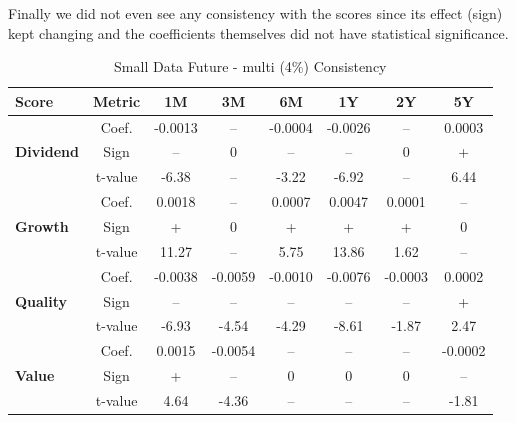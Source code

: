 \documentclass[11pt,english,a4paper,hidelinks]{book}
\begin{document}
\noindent Finally we did not even see any consistency with the scores since its effect (sign) kept changing and the coefficients themselves did not have statistical significance.

\begin{table}[H]
    \centering
    \caption{Small Data Future - \acrshort{multi} (4\%) Consistency}
    \begin{tabular}{lccccccc}
        \toprule
        \textbf{Score} & \textbf{Metric} & \textbf{1M} & \textbf{3M} & \textbf{6M} & \textbf{1Y} & \textbf{2Y} & \textbf{5Y} \\
        \midrule
        \multirow{3}{*}{\textbf{Dividend}} 
            & Coef.   & -0.0013 & --      & -0.0004 & -0.0026 & --      & 0.0003 \\
            & Sign    & --      & 0       & --      & --      & 0       & +      \\
            & t-value & -6.38   & --      & -3.22   & -6.92   & --      & 6.44   \\
        \midrule
        \multirow{3}{*}{\textbf{Growth}} 
            & Coef.   & 0.0018  & --      & 0.0007  & 0.0047  & 0.0001  & --     \\
            & Sign    & +       & 0       & +       & +       & +       & 0      \\
            & t-value & 11.27   & --      & 5.75    & 13.86   & 1.62    & --     \\
        \midrule
        \multirow{3}{*}{\textbf{Quality}} 
            & Coef.   & -0.0038 & -0.0059 & -0.0010 & -0.0076 & -0.0003 & 0.0002 \\
            & Sign    & --      & --      & --      & --      & --      & +      \\
            & t-value & -6.93   & -4.54   & -4.29   & -8.61   & -1.87   & 2.47   \\
        \midrule
        \multirow{3}{*}{\textbf{Value}} 
            & Coef.   & 0.0015  & -0.0054 & --      & --      & --      & -0.0002 \\
            & Sign    & +       & --      & 0       & 0       & 0       & --      \\
            & t-value & 4.64    & -4.36   & --      & --      & --      & -1.81   \\
        \bottomrule
    \end{tabular}
    \label{tab:first_linear_regression_results_scores}
\end{table}

\newpage
\end{document}
